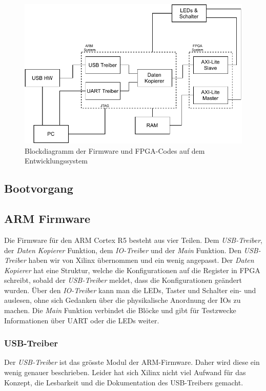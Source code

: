 \documentclass{article}
\begin{document}
\begin{figure}[tb]
    \includegraphics[width=\linewidth]{drawio/bd_firmware_pe1}
    \caption{Blockdiagramm der Firmware und FPGA-Codes auf dem Entwicklungssystem}
    \label{fig:bd_firmware_pe1}
\end{figure}

\subsection{Bootvorgang}



\subsection{ARM Firmware}
Die Firmware für den ARM Cortex R5 besteht aus vier Teilen. Dem \textit{USB-Treiber}, der \textit{Daten Kopierer} Funktion, dem \textit{IO-Treiber} und der \textit{Main} Funktion. Den \textit{USB-Treiber} haben wir von Xilinx übernommen und ein wenig angepasst. Der \textit{Daten Kopierer} hat eine Struktur, welche die Konfigurationen auf die Register in FPGA schreibt, sobald der \textit{USB-Treiber} meldet, dass die Konfigurationen geändert wurden. Über den \textit{IO-Treiber} kann man die LEDs, Taster und Schalter ein- und auslesen, ohne sich Gedanken über die physikalische Anordnung der IOs zu machen. Die \textit{Main} Funktion verbindet die Blöcke und gibt für Testzwecke Informationen über UART oder die LEDs weiter.

\subsubsection*{USB-Treiber}
Der \textit{USB-Treiber} ist das grösste Modul der ARM-Firmware. Daher wird diese ein wenig genauer beschrieben. Leider hat sich Xilinx nicht viel Aufwand für das Konzept, die Lesbarkeit und die Dokumentation des USB-Treibers gemacht.
\end{document}
